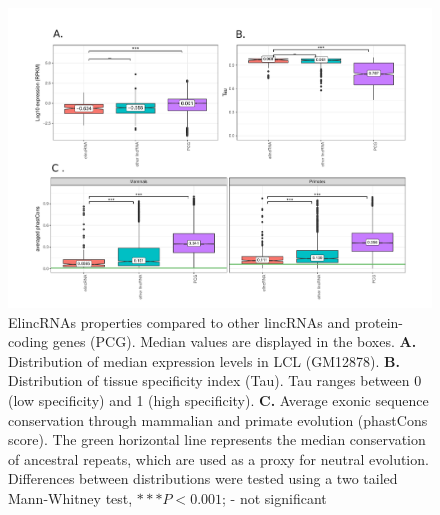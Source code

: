 \documentclass[11pt,a4paper]{report}
\begin{document}
\begin{figure}[ht]
	\includegraphics[width=1\textwidth]{Figures/1_full_characterization_elincRNA.pdf}
	\caption{ElincRNAs properties compared to other lincRNAs and protein-coding genes (PCG). Median values are displayed in the boxes. \textbf{A.} Distribution of median expression levels in LCL (GM12878). \textbf{B.} Distribution of tissue specificity index (Tau). Tau ranges between 0 (low specificity) and 1 (high specificity). \textbf{C.} Average exonic sequence conservation through mammalian and primate evolution (phastCons score). The green horizontal line represents the median conservation of ancestral repeats, which are used as a proxy for neutral evolution. Differences between distributions were tested using a two tailed Mann-Whitney test, $***P<0.001$; - not significant}
	\label{charac_elinc}
\end{figure}
\end{document}
